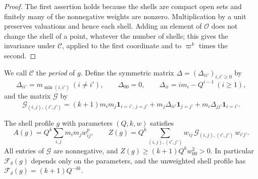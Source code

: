 \begin{proof}
The first assertion holds because the shells are compact open sets and
finitely many of the nonnegative weights are nonzero. Multiplication by
a unit preserves valuations and hence each shell. Adding an element of
$\mathcal O$ does not change the shell of a point, whatever the number
of shells; this gives the invariance under $\mathcal C$, applied to the
first coordinate and to $\varpi^k$ times the second.
\end{proof}

We call $\mathcal C$ the \emph{period} of $g$. Define the symmetric
matrix $\Delta=(\Delta_{ii'})_{i,i'\ge0}$ by
\[
 \Delta_{ii'}=m_{\min(i,i')}\ (i\ne i'),\qquad \Delta_{00}=0,\qquad
 \Delta_{ii}=im_i-Q^{i-1}\ (i\ge1),
\]
and the matrix $\mathcal G$ by
\[
 \mathcal G_{(i,j),(i',j')}=(k+1)m_im_j\mathbf 1_{i=i',\,j=j'}
 +m_j\Delta_{ii'}\mathbf 1_{j=j'}+m_i\Delta_{jj'}\mathbf 1_{i=i'}.
\]

\begin{lemma}\label{fw:shell-lemma}
The shell profile $g$ with parameters $(Q,k,w)$ satisfies
\begin{equation}\label{fw:shell-kernel}
 A(g)=Q^k\sum_{i,j}m_im_jw_{ij}^p,\qquad
 Z(g)=Q^k\sum_{(i,j),(i',j')}w_{ij}\,\mathcal G_{(i,j),(i',j')}\,w_{i'j'} .
\end{equation}
All entries of $\mathcal G$ are nonnegative, and
$Z(g)\ge(k+1)Q^kw_{00}^2>0$. In particular $\mathcal F_\delta(g)$
depends only on the parameters, and the unweighted shell profile has
$\mathcal F_\delta(g)=(k+1)Q^{-\delta k}$.
\end{lemma}

